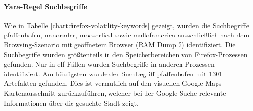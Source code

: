 \paragraph*{Yara-Regel \glqq{}Suchbegriffe\grqq{}}
Wie in Tabelle \ref{chart:firefox-volatility-keywords} gezeigt, wurden die Suchbegriffe \glqq{}pfaffenhofen\grqq{}, \glqq{}nanoradar\grqq{}, \glqq{}mooserliesl\grqq{} sowie \glqq{}mallofamerica\grqq{} ausschließlich nach dem Browsing-Szenario mit geöffnetem Browser (RAM Dump 2) identifiziert. Die Suchbegriffe wurden größtenteils in den Speicherbereichen von Firefox-Prozessen gefunden. Nur in elf Fällen wurden Suchbegriffe in anderen Prozessen identifiziert. Am häufigsten wurde der Suchbegriff \glqq{}pfaffenhofen\grqq{} mit 1301 Artefakten gefunden. Dies ist vermutlich auf den  visuellen Google Maps Kartenausschnitt zurückzuführen, welcher bei der Google-Suche relevante Informationen über die gesuchte Stadt zeigt. 

